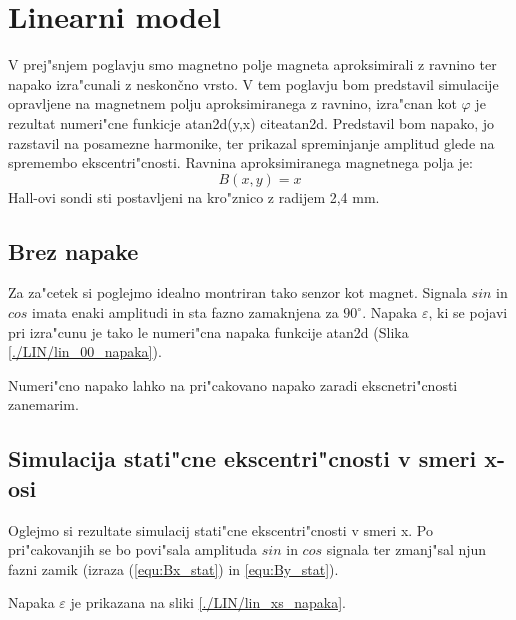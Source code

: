 \chapter{Linearni model}

V prej"snjem poglavju smo magnetno polje magneta aproksimirali z ravnino ter napako izra"cunali z neskončno vrsto. V tem poglavju bom predstavil simulacije opravljene na magnetnem polju aproksimiranega z ravnino, izra"cnan kot $\varphi$ je rezultat numeri"cne funkicje atan2d(y,x) citeatan2d. Predstavil bom napako, jo razstavil na posamezne harmonike, ter prikazal spreminjanje amplitud glede na spremembo ekscentri"cnosti. Ravnina aproksimiranega magnetnega polja je: 
\begin{equation}
\label{equ:lin_polje}
B(x,y)= x
\end{equation}
Hall-ovi sondi sti postavljeni na kro"znico z radijem 2,4 mm.


\section{Brez napake}

Za za"cetek si poglejmo idealno montriran tako senzor kot magnet. Signala $sin$ in $cos$ imata enaki amplitudi in sta fazno zamaknjena za $90^{\circ}$. Napaka $\varepsilon$, ki se pojavi pri izra"cunu je tako le numeri"cna napaka funkcije atan2d (Slika \ref{./LIN/lin_00_napaka}).

Numeri"cno napako lahko na pri"cakovano napako zaradi ekscnetri"cnosti zanemarim.


\newpage
\section{Simulacija stati"cne ekscentri"cnosti v smeri x-osi}

Oglejmo si rezultate simulacij stati"cne ekscentri"cnosti v smeri x. Po pri"cakovanjih se bo povi"sala amplituda $sin$ in $cos$ signala ter zmanj"sal njun fazni zamik (izraza (\ref{equ:Bx_stat}) in \ref{equ:By_stat}).
 
\newpage
Napaka $\varepsilon$  je prikazana na sliki \ref{./LIN/lin_xs_napaka}.

